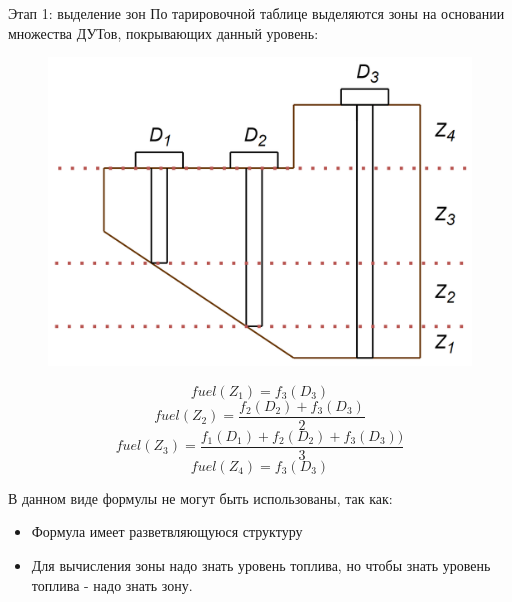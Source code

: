 \documentclass[usenames,dvipsnames,11pt]{beamer}
\begin{document}
\begin{frame}{Этап 1: выделение зон}
	По тарировочной таблице выделяются зоны на основании множества ДУТов, покрывающих данный уровень:
	\\
	\begin{minipage}[h]{0.45\linewidth}
		\begin{figure}
				\centering
				\includegraphics[width=1\linewidth]{graphics/screenshot006}
		\end{figure}
	\end{minipage}
	\hfill
	\begin{minipage}[h]{0.5\linewidth}
		$$fuel(Z_1) = f_3(D_3)$$
		$$fuel(Z_2) = \frac{f_2 (D_2)+f_3 (D_3)}{2}$$
		$$fuel(Z_3) = \frac{f_1 (D_1)+f_2(D_2)+f_3(D_3))}{3}$$
		$$fuel(Z_4)=  f_3 (D_3 )$$
	\end{minipage}
	\bigbreak
	В данном виде формулы не могут быть использованы, так как:
	\begin{itemize}
		\item Формула имеет разветвляющуюся структуру
		\item Для вычисления зоны надо знать уровень топлива, но чтобы знать уровень топлива - надо знать зону.
	\end{itemize}
\end{frame}
\end{document}
